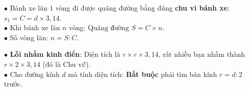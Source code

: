 \documentclass[14pt,a4paper,oneside]{extbook}
\begin{document}
\vspace{3mm}

\noindent
\begin{minipage}[t]{0.54\textwidth}
  \begin{tcolorbox}[
    enhanced,
    title={\footnotesize\bfseries\color{white}\faBicycle\ Dạng toán bánh xe lăn trên đường},
    colback=green!3!white,
    colframe=green!60!black,
    arc=2.5mm, boxrule=0.8pt, top=1.8mm, bottom=1.8mm, left=2.2mm, right=2.2mm
  ]
    \footnotesize
    $\bullet$ Bánh xe lăn $1$ vòng đi được quãng đường bằng đúng \textbf{chu vi bánh xe}: $s_1 = C = d \times 3,14$.\\
    $\bullet$ Khi bánh xe lăn $n$ vòng: $\text{Quãng đường } S = C \times n$.\\
    $\bullet$ Số vòng lăn: $n = S : C$.
  \end{tcolorbox}
\end{minipage}%
\hfill
\begin{minipage}[t]{0.44\textwidth}
  \begin{tcolorbox}[
    enhanced,
    title={\footnotesize\bfseries\color{white}\faExclamationTriangle\ Mẹo tránh bẫy trắc nghiệm},
    colback=red!2!white,
    colframe=red!70!black,
    arc=2.5mm, boxrule=0.8pt, top=1.8mm, bottom=1.8mm, left=2.2mm, right=2.2mm
  ]
    \footnotesize
    $\bullet$ \textbf{Lỗi nhầm kinh điển}: Diện tích là $r \times r \times 3,14$, rất nhiều bạn nhầm thành $r \times 2 \times 3,14$ (đó là Chu vi!).\\
    $\bullet$ Cho đường kính $d$ mà tính diện tích: \textbf{Bắt buộc} phải tìm bán kính $r = d : 2$ trước.
  \end{tcolorbox}
\end{minipage}
\end{document}

